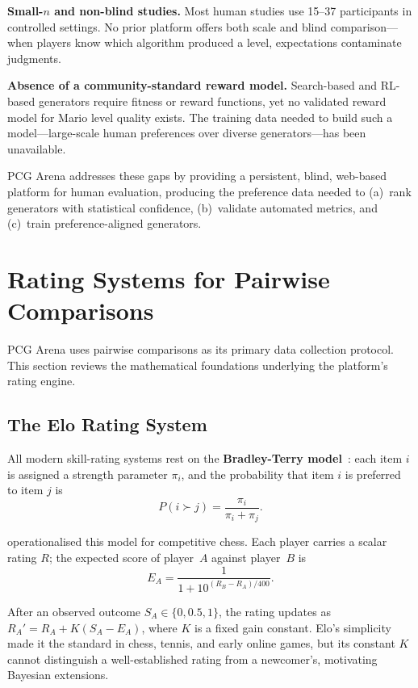 \documentclass[shortabstract, mgr, english]{iithesis}
\begin{document}
\textbf{Small-$n$ and non-blind studies.} Most human studies use 15--37
participants in controlled settings. No prior platform offers both scale and
blind comparison---when players know which algorithm produced a level,
expectations contaminate judgments.

\textbf{Absence of a community-standard reward model.} Search-based and
RL-based generators require fitness or reward functions, yet no validated reward
model for Mario level quality exists. The training data needed to build such a
model---large-scale human preferences over diverse generators---has been
unavailable.

PCG Arena addresses these gaps by providing a persistent, blind, web-based
platform for human evaluation, producing the preference data needed to
(a)~rank generators with statistical confidence, (b)~validate automated
metrics, and (c)~train preference-aligned generators.


\section{Rating Systems for Pairwise Comparisons}
\label{sec:bg-rating}

PCG Arena uses pairwise comparisons as its primary data collection protocol.
This section reviews the mathematical foundations underlying the platform's
rating engine.

\subsection{The Elo Rating System}
\label{subsec:bg-elo}

All modern skill-rating systems rest on the \textbf{Bradley-Terry
model}~\citep{bradley1952rank}: each item $i$ is assigned a strength parameter
$\pi_i$, and the probability that item $i$ is preferred to item $j$ is
%
\begin{equation}
\label{eq:bt}
P(i \succ j) = \frac{\pi_i}{\pi_i + \pi_j}.
\end{equation}

\citet{elo1978rating} operationalised this model for competitive chess. Each
player carries a scalar rating $R$; the expected score of player~$A$ against
player~$B$ is
%
\begin{equation}
\label{eq:elo}
E_A = \frac{1}{1 + 10^{(R_B - R_A)/400}}.
\end{equation}

After an observed outcome $S_A \in \{0, 0.5, 1\}$, the rating updates as
$R_A' = R_A + K(S_A - E_A)$, where $K$ is a fixed gain constant. Elo's
simplicity made it the standard in chess, tennis, and early online games, but its
constant $K$ cannot distinguish a well-established rating from a newcomer's,
motivating Bayesian extensions.
\end{document}
